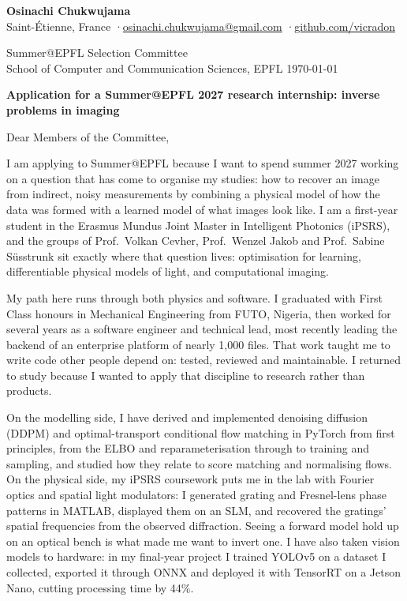 \documentclass[11pt]{article}
\begin{document}
{\large\bfseries Osinachi Chukwujama}\\
Saint-Étienne, France \quad·\quad \href{mailto:osinachi.chukwujama@gmail.com}{osinachi.chukwujama@gmail.com} \quad·\quad \href{https://github.com/vicradon}{github.com/vicradon}

\vspace{0.5em}
Summer@EPFL Selection Committee\\
School of Computer and Communication Sciences, EPFL
\hfill \today

\vspace{0.3em}
\textbf{Application for a Summer@EPFL 2027 research internship: inverse problems in imaging}

Dear Members of the Committee,

I am applying to Summer@EPFL because I want to spend summer 2027 working on a question that has
come to organise my studies: how to recover an image from indirect, noisy measurements by combining
a physical model of how the data was formed with a learned model of what images look like. I am a
first-year student in the Erasmus Mundus Joint Master in Intelligent Photonics (iPSRS), and the
groups of Prof.\ Volkan Cevher, Prof.\ Wenzel Jakob and Prof.\ Sabine Süsstrunk sit exactly where
that question lives: optimisation for learning, differentiable physical models of light, and
computational imaging.

My path here runs through both physics and software. I graduated with First Class honours in
Mechanical Engineering from FUTO, Nigeria, then worked for several years as a software engineer and
technical lead, most recently leading the backend of an enterprise platform of nearly 1,000 files.
That work taught me to write code other people depend on: tested, reviewed and maintainable. I
returned to study because I wanted to apply that discipline to research rather than products.

On the modelling side, I have derived and implemented denoising diffusion (DDPM) and
optimal-transport conditional flow matching in PyTorch from first principles, from the ELBO and
reparameterisation through to training and sampling, and studied how they relate to score matching
and normalising flows. On the physical side, my iPSRS coursework puts me in the lab with Fourier
optics and spatial light modulators: I generated grating and Fresnel-lens phase patterns in MATLAB,
displayed them on an SLM, and recovered the gratings' spatial frequencies from the observed
diffraction. Seeing a forward model hold up on an optical bench is what made me want to invert one.
I have also taken vision models to hardware: in my final-year project I trained YOLOv5 on a dataset I
collected, exported it through ONNX and deployed it with TensorRT on a Jetson Nano, cutting
processing time by 44\%.
\end{document}
